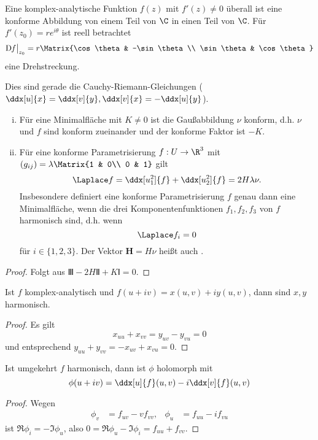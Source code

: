 \begin{nt}
	Eine komplex-analytische Funktion $f(z)$ mit $f'(z) \neq 0$ überall ist eine konforme Abbildung von einem Teil von $\C$ in einen Teil von $\C$. 
	Für $f'(z_0) = r e^{i\theta}$ ist reell betrachtet
	\[
		\Df \big|_{z_0} = r \Matrix{\cos \theta & -\sin \theta \\ \sin \theta & \cos \theta}
	\]
	eine Drehstreckung.

	Dies sind gerade die Cauchy-Riemann-Gleichungen ($\ddx[u]{x} = \ddx[v]{y}, \ddx[v]{x} = - \ddx[u]{y}$).
\end{nt}

\begin{kor}
	\begin{enumerate}[(i)]
		\item
			Für eine Minimalfläche mit $K \neq 0$ ist die Gaußabbildung $\nu$ konform, d.h. $\nu$ und $f$ sind konform zueinander und der konforme Faktor ist $-K$.
		\item
			Für eine konforme Parametrisierung $f: U \to \R^3$ mit $(g_{ij}) = \lambda \Matrix{1 & 0\\ 0 & 1}$ gilt
			\[
				\Laplace f = \ddx[u_1^2]{f} + \ddx[u_2^2]{f} = 2 H \lambda \nu.
			\]
			Insbesondere definiert eine konforme Parametrisierung $f$ genau dann eine Minimalfläche, wenn die drei Komponentenfunktionen $f_1, f_2, f_3$ von $f$ harmonisch sind, d.h. wenn
			\[
				\Laplace f_i = 0
			\]
			für $i \in \{1, 2, 3\}$.
			Der Vektor $\mathbf H = H \nu$ heißt auch .
	\end{enumerate}
	\begin{proof}
		Folgt aus $Ⅲ - 2HⅡ + KⅠ = 0$.
	\end{proof}
\end{kor}

\begin{kor}
	Ist $f$ komplex-analytisch und $f(u+iv) = x(u,v) + iy(u,v)$, dann sind $x, y$ harmonisch.
	\begin{proof}
		Es gilt
		\[
			x_{uu} + x_{vv} = y_{uv} - y_{vu} = 0
		\]
		und entsprechend $y_{uu} + y_{vv} = -x_{uv} + x_{vu} = 0$.
	\end{proof}
\end{kor}

\begin{st}
	Ist umgekehrt $f$ harmonisch, dann ist $\phi$ holomorph mit
	\[
		\phi(u + iv) = \ddx[u]{f}(u,v) - i \ddx[v]{f}(u,v)
	\]
	\begin{proof}
		Wegen
		\begin{align*}
			\phi_v &= f_{uv} - v f_{vv}, &
			\phi_u &= f_{uu} - i f_{vu}
		\end{align*}
		ist $\Re \phi_i = - \Im \phi_u$, also $0 = \Re \phi_u - \Im \phi_i = f_{uu} + f_{vv}$. 
	\end{proof}	
\end{st}

